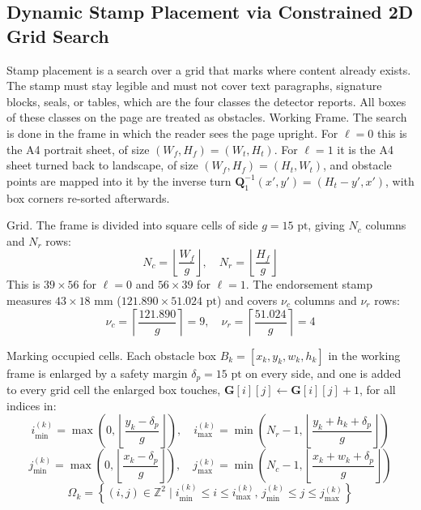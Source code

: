 \subsection{Dynamic Stamp Placement via Constrained 2D Grid Search}
\label{sec:dynamic_stamp_placement}

Stamp placement is a search over a grid that marks where content already exists.
The stamp must stay legible and must not cover text paragraphs, signature blocks, seals, or tables, which are the four classes the detector reports.
All boxes of these classes on the page are treated as obstacles.
Working Frame. The search is done in the frame in which the reader sees the page upright.
For $\ell = 0$ this is the A4 portrait sheet, of size $(W_f, H_f) = (W_t, H_t)$.
For $\ell = 1$ it is the A4 sheet turned back to landscape, of size $(W_f, H_f) = (H_t, W_t)$, and obstacle points are mapped into it by the inverse turn $\mathbf{Q}_1^{-1}(x', y') = (H_t - y', x')$, with box corners re-sorted afterwards.

Grid. The frame is divided into square cells of side $g = 15\text{ pt}$, giving $N_c$ columns and $N_r$ rows:
\begin{equation}
\label{eq:grid_dimensions}
N_c = \left\lfloor \frac{W_f}{g} \right\rfloor, \quad N_r = \left\lfloor \frac{H_f}{g} \right\rfloor
\end{equation}
This is $39 \times 56$ for $\ell = 0$ and $56 \times 39$ for $\ell = 1$.
The endorsement stamp measures $43 \times 18\text{ mm}$ ($121.890 \times 51.024\text{ pt}$) and covers $\nu_c$ columns and $\nu_r$ rows:
\begin{equation}
\label{eq:stamp_cell_span}
\nu_c = \left\lceil \frac{121.890}{g} \right\rceil = 9, \quad \nu_r = \left\lceil \frac{51.024}{g} \right\rceil = 4
\end{equation}

Marking occupied cells. Each obstacle box $B_k = [x_k, y_k, w_k, h_k]$ in the working frame is enlarged by a safety margin $\delta_p = 15\text{ pt}$ on every side, and one is added to every grid cell the enlarged box touches, $\mathbf{G}[i][j] \leftarrow \mathbf{G}[i][j] + 1$, for all indices in:
\begin{equation}
\label{eq:row_range}
i_{\min}^{(k)} = \max\left(0, \left\lfloor \frac{y_k - \delta_p}{g} \right\rfloor\right), \quad i_{\max}^{(k)} = \min\left(N_r - 1, \left\lfloor \frac{y_k + h_k + \delta_p}{g} \right\rfloor\right)
\end{equation}
\begin{equation}
\label{eq:col_range}
j_{\min}^{(k)} = \max\left(0, \left\lfloor \frac{x_k - \delta_p}{g} \right\rfloor\right), \quad j_{\max}^{(k)} = \min\left(N_c - 1, \left\lfloor \frac{x_k + w_k + \delta_p}{g} \right\rfloor\right)
\end{equation}
\begin{equation}
\label{eq:cell_indices_set}
\Omega_k = \left\{ (i, j) \in \mathbb{Z}^2 \mid i_{\min}^{(k)} \le i \le i_{\max}^{(k)}, \, j_{\min}^{(k)} \le j \le j_{\max}^{(k)} \right\}
\end{equation}

